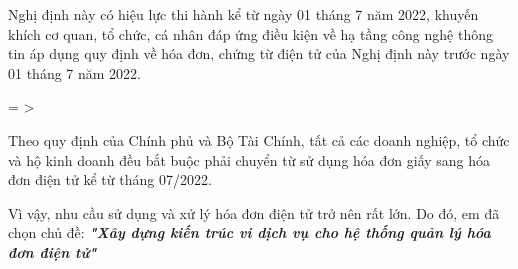 Nghị định này có hiệu lực thi hành kể từ ngày 01 tháng 7 năm 2022, khuyến khích cơ quan, tổ chức, cá nhân đáp ứng điều kiện về hạ tầng công nghệ thông tin áp dụng quy định về hóa đơn, chứng từ điện tử của Nghị định này trước ngày 01 tháng 7 năm 2022.

= >

Theo quy định của Chính phủ và Bộ Tài Chính, tất cả các doanh nghiệp, tổ chức và hộ kinh doanh đều bắt buộc phải chuyển từ sử dụng hóa đơn giấy sang hóa đơn điện tử kể từ tháng 07/2022.

Vì vậy, nhu cầu sử dụng và xử lý hóa đơn điện tử trở nên rất lớn. Do đó, em đã chọn chủ đề: \textbf{\textit{"Xây dựng kiến trúc vi dịch vụ cho hệ thống quản lý hóa đơn điện tử"}}

